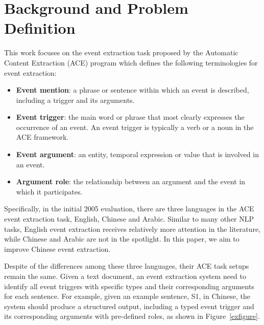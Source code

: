 \section{Background and Problem Definition}
\label{background}
This work focuses on the
event extraction task proposed by the Automatic Content Extraction (ACE) program \cite{doddington2004automatic} which
defines the following terminologies for event extraction:

\begin{itemize}
	\item \textbf{Event mention}:  a phrase or sentence within which an event is described, including a trigger and its arguments.
	\item \textbf{Event trigger}: the main word or phrase that most clearly expresses the occurrence of an event. An event trigger is typically a verb or a noun in the ACE framework.
	\item \textbf{Event argument}: an entity, temporal expression or value that is involved in an event.
	\item \textbf{Argument role}: the relationship between an argument and the event in which it participates.
\end{itemize}

Specifically, in the initial 2005 evaluation, there are three languages in the ACE event extraction task,  English, Chinese and Arabic. Similar to many other NLP tasks, English event extraction receives relatively more attention in the literature, while Chinese and Arabic are not in the spotlight.  In this paper, we aim to improve Chinese event extraction.

Despite of the differences among these three languages, their ACE task setups remain the same.
Given a text document, an event extraction system need to identify all event triggers with specific types and their corresponding arguments for each sentence. For example, given an example sentence, S1, in Chinese, the system should produce a structured output, including a typed event trigger  and its corresponding arguments  with pre-defined  roles, as shown in Figure~\ref{exfigure}.



